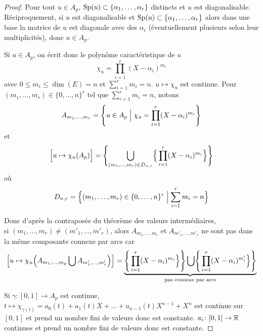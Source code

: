 \begin{proof}
	Pour tout $u\in A_{p}$, $\operatorname{Sp}(u)\subset\{\alpha_{1},\dots,\alpha_{r}\}$ distincts et $u$ est diagonalisable. Réciproquement, si $u$ est diagonalisable et $\operatorname{Sp}(u)\subset\{\alpha_{1},\dots,\alpha_{r}\}$ alors dans une base la matrice de $u$ est diagonale avec des $\alpha_{i}$ (éventuellement plusieurs selon leur multiplicités), donc $u\in A_{p}$.

	Si $u\in A_{p}$, on écrit donc le polynôme caractéristique de $u$
	\begin{equation}\chi_{u}=\prod_{i=1}^{r}(X-\alpha_{i})^{m_{i}}\end{equation}
	avec $0\leqslant m_{i}\leqslant\dim(E)=n$ et $\sum_{i=1}^{r}m_{i}=n$.
	$u\mapsto\chi_{u}$ est continue. Pour $(m_{1},\dots,m_{r})\in\{0,\dots,n\}^{r}$ tel que $\sum_{i=1}^{r}m_{i}=n$, notons 
	\begin{equation}A_{m_{1},\dots,m_{r}}=\Biggl\{u\in A_{p}\Bigm|\chi_{u}=\prod_{i=1}^{r}(X-\alpha_{i})^{m_{i}}\Biggr\}\end{equation}
	et 
	\begin{equation}\Bigl[u\mapsto\chi_u(A_{p})\Bigr]=\Biggl\{\bigcup_{(m_{1},\dots,m_{r})\in D_{n,r}}\Bigr\{\prod_{i=1}^{r}(X-\alpha_{i})^{m_{i}}\Bigr\}\Biggr\}\end{equation}
	où
	\begin{equation}D_{n,r}=\Bigl\{(m_{1},\dots,m_{r})\in\{0,\dots,n\}^{r}\Bigm|\sum_{i=1}^{r}m_{i}=n\Bigr\}\end{equation}

	Donc d'après la contraposée du théorème des valeurs intermédiaires,\\si $(m_{1},\dots,m_{r})\neq(m'_{1},\dots,m'_{r})$, alors $A_{m_{1},\dots,m_{r}}$ et $A_{m'_{1},\dots,m'_{r}}$ ne sont pas dans la même composante connexe par arcs car
	\begin{equation}\Bigl[u\mapsto\chi_u\Bigl(A_{m_{1},\dots,m_{p}}\bigcup A_{m'_{1},\dots,m'_{r}}\Bigr)\Bigr]=\underbrace{\Biggr\{\prod_{i=1}^{r}(X-\alpha_{i})^{m_{i}}\Bigr\}\Biggr\}\bigcup\Biggr\{\prod_{i=1}^{r}(X-\alpha_{i})^{m'_{i}}\Bigr\}\Biggr\}}_{\text{pas connexe par arcs}}\end{equation}
	
	Si $\gamma\colon[0,1]\to A_{p}$ est continue, $t\mapsto\chi_{\gamma(t)}=a_{0}(t)+a_{1}(t)X+\dots+a_{n-1}(t)X^{n-1}+X^{n}$ est continue sur $[0,1]$ et prend un nombre fini de valeurs donc est constante. $a_{i}\colon[0,1]\to\mathbb{R}$ continues et prend un nombre fini de valeurs donc est constante.


\end{proof}

